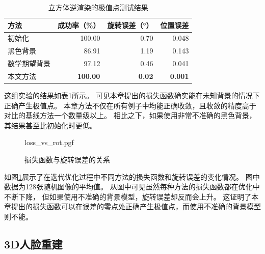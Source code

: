 \begin{table}
    \centering
    \caption{立方体逆渲染的极值点测试结果}
    \label{tab:cube_opt2}
    \begin{tabular}{l|rrr}
        \toprule
        方法       & 成功率（\%） & 旋转误差（°） & 位置误差 \\
        \midrule
        初始化      & 100.00 & 0.70 & 0.048 \\
        黑色背景    & 86.91 & 1.19 & 0.143 \\
        数学期望背景& 97.12 & 0.46 & 0.041 \\
        本文方法    & \textbf{100.00} & \textbf{0.02} & \textbf{0.001} \\
        \bottomrule
    \end{tabular}
\end{table}
这组实验的结果如表\ref{tab:cube_opt2}所示。
可见本章提出的损失函数确实能在未知背景的情况下正确产生极值点。
本章方法不仅在所有例子中均能正确收敛，且收敛的精度高于对比的基线方法一个数量级以上。
相比之下，如果使用非常不准确的黑色背景，其结果甚至比初始化时更低。
\begin{figure}
    {loss_vs_rot.pgf}
    \caption{损失函数与旋转误差的关系}
    \label{fig:loss_vs_rot}
\end{figure}
如图\ref{fig:loss_vs_rot}展示了在迭代优化过程中不同方法的损失函数和旋转误差的变化情况。
图中数据为128张随机图像的平均值。
从图中可见虽然每种方法的损失函数都在优化中不断下降，
但如果使用不准确的背景模型，旋转误差却反而会上升。
这证明了本章提出的损失函数可以在误差的零点处正确产生极值点，而使用不准确的背景模型则不能。

\subsection{3D人脸重建}

